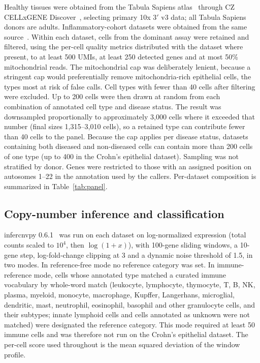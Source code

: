 \documentclass[11pt,letterpaper]{article}
\begin{document}
Healthy tissues were obtained from the Tabula Sapiens atlas~\cite{tabula} through CZ CELLxGENE Discover~\cite{cellxgene2025}, selecting primary 10x 3$'$ v3 data; all Tabula Sapiens donors are adults. Inflammatory-cohort datasets were obtained from the same source~\cite{kong2023,gao2021pso,smillie2019}. Within each dataset, cells from the dominant assay were retained and filtered, using the per-cell quality metrics distributed with the dataset where present, to at least 500 UMIs, at least 250 detected genes and at most 50\% mitochondrial reads. The mitochondrial cap was deliberately lenient, because a stringent cap would preferentially remove mitochondria-rich epithelial cells, the types most at risk of false calls. Cell types with fewer than 40 cells after filtering were excluded. Up to 200 cells were then drawn at random from each combination of annotated cell type and disease status. The result was downsampled proportionally to approximately 3{,}000 cells where it exceeded that number (final sizes 1{,}315--3{,}010 cells), so a retained type can contribute fewer than 40 cells to the panel. Because the cap applies per disease status, datasets containing both diseased and non-diseased cells can contain more than 200 cells of one type (up to 400 in the Crohn's epithelial dataset). Sampling was not stratified by donor. Genes were restricted to those with an assigned position on autosomes 1--22 in the annotation used by the callers. Per-dataset composition is summarized in Table~\ref{tab:panel}.

\subsection{Copy-number inference and classification}

infercnvpy 0.6.1~\cite{infercnvpy} was run on each dataset on log-normalized expression (total counts scaled to $10^4$, then $\log(1+x)$), with 100-gene sliding windows, a 10-gene step, log-fold-change clipping at 3 and a dynamic noise threshold of 1.5, in two modes. In reference-free mode no reference category was set. In immune-reference mode, cells whose annotated type matched a curated immune vocabulary by whole-word match (leukocyte, lymphocyte, thymocyte, T, B, NK, plasma, myeloid, monocyte, macrophage, Kupffer, Langerhans, microglial, dendritic, mast, neutrophil, eosinophil, basophil and other granulocyte cells, and their subtypes; innate lymphoid cells and cells annotated as unknown were not matched) were designated the reference category. This mode required at least 50 immune cells and was therefore not run on the Crohn's epithelial dataset. The per-cell score used throughout is the mean squared deviation of the window profile.
\end{document}
